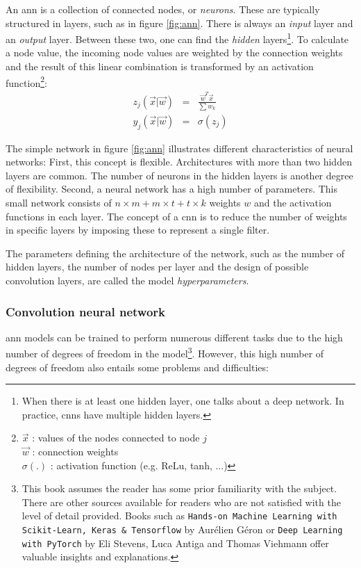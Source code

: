 \par{
    An \acrshort{ann} is a collection of connected nodes, or \textit{neurons}. 
    These are typically structured in layers, such as in figure \ref{fig:ann}. 
    There is always an \textit{input} layer and an \textit{output} layer. Between these two, one can find the \textit{hidden} layers\footnote{When there is at least one hidden layer, one talks about a deep network. In practice, \acrshort{cnn}s have multiple hidden layers.}.
    To calculate a node value, the incoming node values are weighted by the connection weights and the result of this linear combination is transformed by an activation function\footnote{
        $\vec{x}$ : values of the nodes connected to node $j$\\
        $\vec{w}$ : connection weights\\
        $\sigma(.)$ : activation function (e.g. ReLu, tanh, ...)
    }:
    \begin{eqnarray}
        z_j(\vec{x} | \vec{w}) &=& \frac{\vec{w}^T\vec{x}}{\sum w_k} \\
        y_j(\vec{x} | \vec{w}) &=& \sigma(z_j)
    \end{eqnarray}

}
\par{
    The simple network in figure \ref{fig:ann} illustrates different characteristics of neural networks: 
    First, this concept is flexible.
    Architectures with more than two hidden layers are common. 
    The number of neurons in the hidden layers is another degree of flexibility. 
    Second, a neural network has a high number of parameters. This small network consists of $n\times m + m \times t + t \times k$ weights $w$ and the activation functions in each layer.
    The concept of a \acrfull{cnn} is to reduce the number of weights in specific layers by imposing these to represent a single filter.
}
\par{
    The parameters defining the architecture of the network, such as the number of hidden layers, the number of nodes per layer and the design of possible convolution layers, are called the model \textit{hyperparameters}.
}


\subsubsection{Convolution neural network}

\acrshort{ann} models can be trained to perform numerous different tasks due to the high number of degrees of freedom in the model\footnote{
    This book assumes the reader has some prior familiarity with the subject.
    There are other sources available for readers who are not satisfied with the level of detail provided.
    Books such as \texttt{Hands-on Machine Learning with Scikit-Learn, Keras \& Tensorflow} by Aurélien Géron or \texttt{Deep Learning with PyTorch} by Eli Stevens, Luca Antiga and Thomas Viehmann offer valuable insights and explanations.
}.
However, this high number of degrees of freedom also entails some problems and difficulties:

